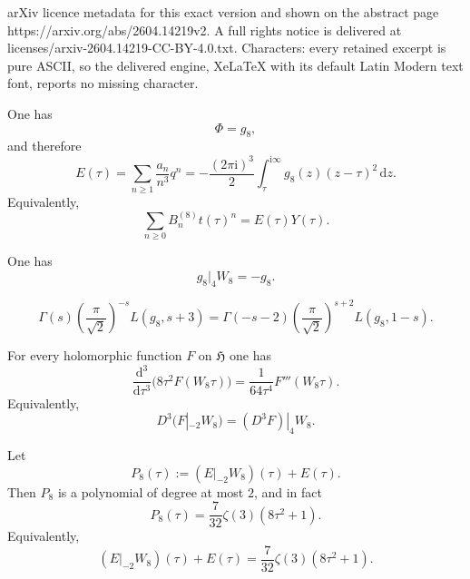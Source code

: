 \documentclass[10pt,a4paper]{amsart}
\newcommand{\Dop}{D}
\newcommand{\Hh}{\mathfrak{H}}
\newcommand{\dd}{\mathrm{d}}
\newcommand{\ii}{\mathrm{i}}
\begin{document}
arXiv licence metadata for this exact version and shown on the abstract page https://arxiv.org/abs/2604.14219v2. A full rights notice is delivered at licenses/arxiv-2604.14219-CC-BY-4.0.txt. Characters: every retained excerpt is pure ASCII, so the delivered engine, XeLaTeX with its default Latin Modern text font, reports no missing character.
\begin{proposition}\label{prop:E-eichler}
One has
\begin{equation}\label{eq:Phi-equals-g}
\Phi=g_8,
\end{equation}
and therefore
\begin{equation}\label{eq:E-qseries}
E(\tau)=\sum_{n\ge 1}\frac{a_n}{n^3}q^n
=-\frac{(2\pi\ii)^3}{2}\int_{\tau}^{\ii\infty}g_8(z)(z-\tau)^2\,\dd z.
\end{equation}
Equivalently,
\begin{equation}\label{eq:B-param}
\sum_{n\ge 0}B_n^{(8)}t(\tau)^n=E(\tau)Y(\tau).
\end{equation}
\end{proposition}

\begin{lemma}\label{lem:g-transform}
One has
\begin{equation}\label{eq:g-transform}
g_8|_4W_8=-g_8.
\end{equation}
\end{lemma}

\begin{equation}\label{eq:L-functional}
\Gamma(s)\left(\frac{\pi}{\sqrt2}\right)^{-s}L(g_8,s+3)
=\Gamma(-s-2)\left(\frac{\pi}{\sqrt2}\right)^{s+2}L(g_8,1-s).
\end{equation}

\begin{lemma}\label{lem:bol}
For every holomorphic function $F$ on $\Hh$ one has
\begin{equation}\label{eq:bol}
\frac{\dd^3}{\dd\tau^3}\bigl(8\tau^2F(W_8\tau)\bigr)
=\frac{1}{64\tau^4}F'''(W_8\tau).
\end{equation}
Equivalently,
\[
\Dop^3(F|_{-2}W_8)=(\Dop^3F)|_4W_8.
\]
\end{lemma}

\begin{proposition}\label{prop:period-polynomial}
Let
\begin{equation}\label{eq:P8-def}
P_8(\tau):=(E|_{-2}W_8)(\tau)+E(\tau).
\end{equation}
Then $P_8$ is a polynomial of degree at most $2$, and in fact
\begin{equation}\label{eq:period-polynomial}
P_8(\tau)=\frac{7}{32}\zeta(3)(8\tau^2+1).
\end{equation}
Equivalently,
\begin{equation}\label{eq:E-transform}
(E|_{-2}W_8)(\tau)+E(\tau)=\frac{7}{32}\zeta(3)(8\tau^2+1).
\end{equation}
\end{proposition}
\end{document}
